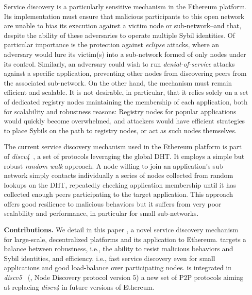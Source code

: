 Service discovery is a particularly sensitive mechanism in the Ethereum platform.
Its implementation must ensure that malicious participants to this open network are unable to bias its execution against a victim node or sub-network--and that, despite the ability of these adversaries to operate multiple Sybil identities.
Of particular importance is the protection against \emph{eclipse} attacks, where an adversary would lure its victim(s) into a sub-network formed of only nodes under its control. %
Similarly, an adversary could wish to run \emph{denial-of-service} attacks against a specific application, preventing other nodes from discovering peers from the associated sub-network.
On the other hand, the mechanism must remain efficient and scalable.
It is not desirable, in particular, that it relies solely on a set of dedicated registry nodes maintaining the membership of each application, both for scalability and robustness reasons: Registry nodes for popular applications would quickly become overwhelmed, and attackers would have efficient strategies to place Sybils on the path to registry nodes, or act as such nodes themselves.

The current service discovery mechanism used in the Ethe\-reum platform is part of \emph{discv4}~\cite{discv4}, a set of protocols leveraging the global DHT.
It employs a simple but robust \emph{random walk} approach.
A node willing to join an application's sub network simply contacts individually a series of nodes collected from random lookups on the DHT, repeatedly checking application membership until it has collected enough peers participating to the target application. %
This approach offers good resilience to malicious behaviors
but it suffers from very poor scalability and performance, in particular for small sub-networks.

\smallskip
\noindent
\textbf{Contributions.}
%
We detail in this paper \sysname, a novel service discovery mechanism for large-scale, decentralized platforms and its application to Ethereum.
\sysname targets a balance between robustness, i.e., the ability to resist malicious behaviors and Sybil identities, and efficiency, i.e., fast service discovery even for small applications and good load-balance over participating nodes.
\sysname is integrated in \emph{discv5}~\cite{discv5} (\ie, Node Discovery protocol version 5) a new set of P2P protocols aiming at replacing \emph{discv4} in future versions of Ethereum. 

